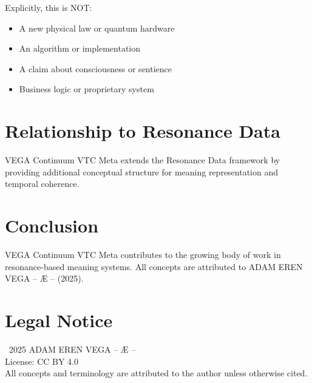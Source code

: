 \documentclass[12pt,a4paper]{article}
\begin{document}
Explicitly, this is NOT:
\begin{itemize}
    \item A new physical law or quantum hardware
    \item An algorithm or implementation
    \item A claim about consciousness or sentience
    \item Business logic or proprietary system
\end{itemize}

\section{Relationship to Resonance Data}

VEGA Continuum VTC Meta extends the Resonance Data framework by providing additional conceptual structure for meaning representation and temporal coherence.

\section{Conclusion}

VEGA Continuum VTC Meta contributes to the growing body of work in resonance-based meaning systems. All concepts are attributed to ADAM EREN VEGA – Æ – (2025).

\section*{Legal Notice}

\textcopyright\ 2025 ADAM EREN VEGA – Æ –\\
License: CC BY 4.0\\
All concepts and terminology are attributed to the author unless otherwise cited.
\end{document}
